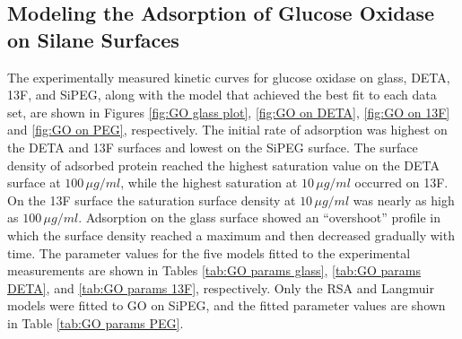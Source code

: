 \subsection{Modeling the Adsorption of Glucose Oxidase on Silane Surfaces}

The experimentally measured kinetic curves for glucose oxidase on
glass, DETA, 13F, and SiPEG, along with the model that achieved the
best fit to each data set, are shown in Figures \ref{fig:GO glass plot},
\ref{fig:GO on DETA}, \ref{fig:GO on 13F} and \ref{fig:GO on PEG},
respectively. The initial rate of adsorption was highest on the DETA
and 13F surfaces and lowest on the SiPEG surface. The surface density
of adsorbed protein reached the highest saturation value on the DETA
surface at $100\,\mu g/ml$, while the highest saturation at $10\,\mu g/ml$
occurred on 13F. On the 13F surface the saturation surface density
at $10\,\mu g/ml$ was nearly as high as $100\,\mu g/ml$. Adsorption
on the glass surface showed an {}``overshoot'' profile in which
the surface density reached a maximum and then decreased gradually
with time. The parameter values for the five models fitted to the
experimental measurements are shown in Tables \ref{tab:GO params glass},
\ref{tab:GO params DETA}, and \ref{tab:GO params 13F}, respectively.
Only the RSA and Langmuir models were fitted to GO on SiPEG, and the
fitted parameter values are shown in Table \ref{tab:GO params PEG}.

